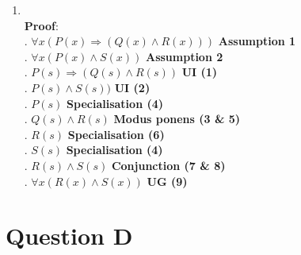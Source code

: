 \documentclass[a4paper]{article}
\begin{document}
\begin{enumerate}

\vspace{5mm}
\item \noindent \\
\indent\indent \textbf{Proof}:\\
\vspace{2mm}
\indent{}. \( \forall x(P(x) \Rightarrow (Q(x) \wedge R(x)))\) \hfill \textbf{Assumption 1}\\
\indent{}. \( \forall x(P(x) \wedge S(x)) \) \hfill \textbf{Assumption 2}\\
\indent{}. \( P(s) \Rightarrow (Q(s) \wedge R(s)) \) \hfill \textbf{UI (1)}\\
\indent{}. \( P(s) \wedge S(s)) \) \hfill \textbf{UI (2)}\\
\indent{}. \( P(s) \) \hfill \textbf{Specialisation (4)}\\
\indent{}. \( Q(s) \wedge R(s) \) \hfill \textbf{Modus ponens (3 \& 5)}\\
\indent{}. \( R(s) \) \hfill \textbf{Specialisation (6)}\\
\indent{}. \( S(s) \) \hfill \textbf{Specialisation (4)}\\
\indent{}. \( R(s) \wedge S(s) \) \hfill \textbf{Conjunction (7 \& 8)}\\
\indent{}. \( \forall x(R(x) \wedge S(x)) \) \hfill \textbf{UG (9)}\\

\end{enumerate}


\newpage
\section{Question D}
\end{document}
